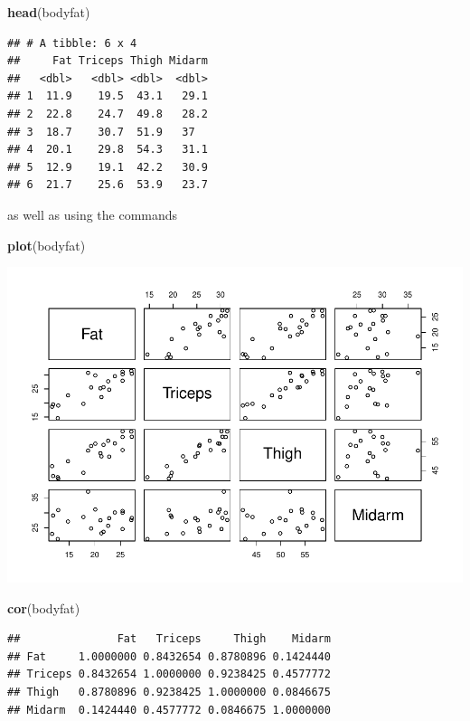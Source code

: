 \documentclass[
]{article}
\newenvironment{Shaded}{\begin{snugshade}}{\end{snugshade}}
\newcommand{\KeywordTok}[1]{\textcolor[rgb]{0.13,0.29,0.53}{\textbf{#1}}}
\newcommand{\NormalTok}[1]{#1}
\begin{document}
\begin{Shaded}
\begin{Highlighting}[]
\KeywordTok{head}\NormalTok{(bodyfat)}
\end{Highlighting}
\end{Shaded}

\begin{verbatim}
## # A tibble: 6 x 4
##     Fat Triceps Thigh Midarm
##   <dbl>   <dbl> <dbl>  <dbl>
## 1  11.9    19.5  43.1   29.1
## 2  22.8    24.7  49.8   28.2
## 3  18.7    30.7  51.9   37  
## 4  20.1    29.8  54.3   31.1
## 5  12.9    19.1  42.2   30.9
## 6  21.7    25.6  53.9   23.7
\end{verbatim}

as well as using the commands

\begin{Shaded}
\begin{Highlighting}[]
\KeywordTok{plot}\NormalTok{(bodyfat)}
\end{Highlighting}
\end{Shaded}

\begin{center}\includegraphics{matstatproblems20-21_files/figure-latex/unnamed-chunk-68-1} \end{center}

\begin{Shaded}
\begin{Highlighting}[]
\KeywordTok{cor}\NormalTok{(bodyfat)}
\end{Highlighting}
\end{Shaded}

\begin{verbatim}
##               Fat   Triceps     Thigh    Midarm
## Fat     1.0000000 0.8432654 0.8780896 0.1424440
## Triceps 0.8432654 1.0000000 0.9238425 0.4577772
## Thigh   0.8780896 0.9238425 1.0000000 0.0846675
## Midarm  0.1424440 0.4577772 0.0846675 1.0000000
\end{verbatim}
\end{document}
